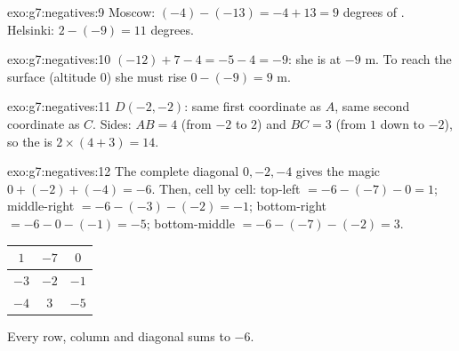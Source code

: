 \begin{solution}{exo:g7:negatives:9}
Moscow: $(-4) - (-13) = -4 + 13 = 9$ degrees of .
Helsinki: $2 - (-9) = 11$ degrees.
\end{solution}

\begin{solution}{exo:g7:negatives:10}
$(-12) + 7 - 4 = -5 - 4 = -9$: she is at $-9$ m. To reach the surface
(altitude $0$) she must rise $0 - (-9) = 9$ m.
\end{solution}

\begin{solution}{exo:g7:negatives:11}
$D(-2, -2)$: same first coordinate as $A$, same second coordinate as
$C$. Sides: $AB = 4$ (from $-2$ to $2$) and $BC = 3$ (from $1$ down to
$-2$), so the  is $2 \times (4 + 3) = 14$.
\end{solution}

\begin{solution}{exo:g7:negatives:12}
The complete diagonal $0, -2, -4$ gives the magic 
$0 + (-2) + (-4) = -6$. Then, cell by cell:
top-left $= -6 - (-7) - 0 = 1$; middle-right $= -6 - (-3) - (-2) =
-1$; bottom-right $= -6 - 0 - (-1) = -5$; bottom-middle
$= -6 - (-7) - (-2) = 3$.
\begin{center}
\renewcommand{\arraystretch}{1.4}
\begin{tabular}{|c|c|c|}
\hline
$1$ & $-7$ & $0$ \\
\hline
$-3$ & $-2$ & $-1$ \\
\hline
$-4$ & $3$ & $-5$ \\
\hline
\end{tabular}
\end{center}
Every row, column and diagonal sums to $-6$.
\end{solution}

